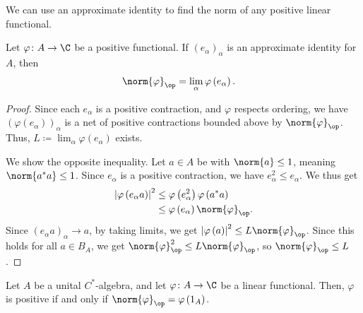 \documentclass[10pt]{mypackage}
\begin{document}
We can use an approximate identity to find the norm of any positive linear functional.
\begin{proposition}
  Let $\varphi\colon A\rightarrow \C$ be a positive functional. If $\left(e_{\alpha}\right)_{\alpha}$ is an approximate identity for $A$, then
  \begin{align*}
    \norm{\varphi}_{\op} &= \lim_{\alpha}\varphi\left(e_{\alpha}\right).
  \end{align*}
\end{proposition}
\begin{proof}
  Since each $e_{\alpha}$ is a positive contraction, and $\varphi$ respects ordering, we have $\left(\varphi\left(e_{\alpha}\right)\right)_{\alpha}$ is a net of positive contractions bounded above by $\norm{\varphi}_{\op}$. Thus, $L\coloneq \lim_{\alpha}\varphi\left(e_\alpha\right)$ exists.\newline

  We show the opposite inequality. Let $a\in A$ be with $\norm{a}\leq 1$, meaning $\norm{a^{\ast}a}\leq 1$. Since $e_{\alpha}$ is a positive contraction, we have $e_{\alpha}^2 \leq e_{\alpha}$. We thus get
  \begin{align*}
    \left\vert \varphi\left(e_{\alpha}a\right) \right\vert^2 &\leq \varphi\left(e_{\alpha}^2\right)\varphi\left(a^{\ast}a\right)\\
                                                             &\leq \varphi\left(e_{\alpha}\right)\norm{\varphi}_{\op}.
  \end{align*}
  Since $\left(e_{\alpha}a\right)_{\alpha}\rightarrow a$, by taking limits, we get $\left\vert \varphi\left(a\right) \right\vert^2 \leq L\norm{\varphi}_{\op}$. Since this holds for all $a\in B_A$, we get $\norm{\varphi}_{\op}^2 \leq L\norm{\varphi}_{\op}$, so $\norm{\varphi}_{\op}\leq L$.
\end{proof}
\begin{proposition}
  Let $A$ be a unital $C^{\ast}$-algebra, and let $\varphi\colon A\rightarrow \C$ be a linear functional. Then, $\varphi$ is positive if and only if $\norm{\varphi}_{\op} = \varphi\left(1_A\right)$.
\end{proposition}
\end{document}
